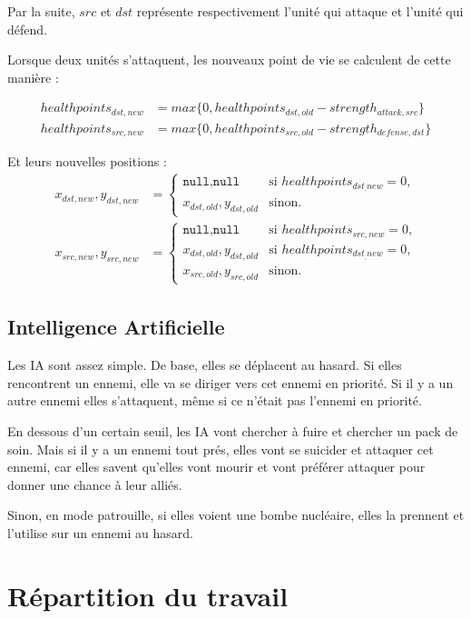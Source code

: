 \documentclass{article}
\begin{document}
Par la suite, $src$ et $dst$ représente respectivement l'unité qui attaque et l'unité
qui défend.

Lorsque deux unités s'attaquent, les nouveaux point de vie se calculent de cette manière : 

\begin{align}
    healthpoints_{dst,new} &= max \{0,healthpoints_{dst,old} - strength_{attack,src}\} \\
    healthpoints_{src,new} &= max \{0,healthpoints_{src,old} - strength_{defense,dst}\}
\end{align}

Et leurs nouvelles positions : 
\begin{align}
     x_{dst,new},y_{dst,new} &=
     \begin{cases}
        \texttt{null},\texttt{null} & \text{si } healthpoints_{dst_,new} = 0 \text{,}\\
        x_{dst,old},y_{dst,old} & \text{sinon.} 
     \end{cases} \\
     x_{src,new},y_{src,new} &=
     \begin{cases}
        \texttt{null},\texttt{null} & \text{si } healthpoints_{src,new} = 0 \text{,}\\
        x_{dst,old},y_{dst,old} & \text{si } healthpoints_{dst_,new} = 0 \text{,}\\
        x_{src,old},y_{src,old} & \text{sinon.} 
     \end{cases}
\end{align}

\subsection{Intelligence Artificielle}
Les IA sont assez simple. De base, elles se déplacent au hasard.
Si elles rencontrent un ennemi, elle va se diriger vers cet ennemi en priorité. Si il y a un
autre ennemi elles s'attaquent, même si ce n'était pas l'ennemi en priorité.

En dessous d'un certain seuil, les IA vont chercher à fuire et chercher un pack de soin. Mais si il y a un ennemi
tout prés, elles vont se suicider et attaquer cet ennemi, car elles savent qu'elles vont mourir et vont préférer attaquer 
pour donner une chance à leur alliés.

Sinon, en mode patrouille, si elles voient une bombe nucléaire, elles la prennent et l'utilise sur un ennemi au hasard.
\section{Répartition du travail}
\end{document}

